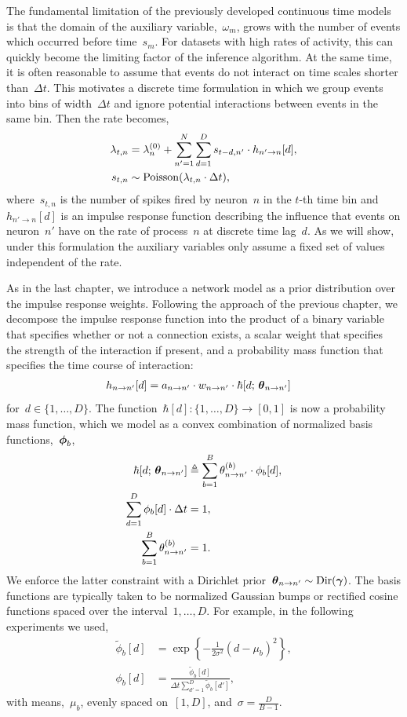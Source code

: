 The fundamental limitation of the previously developed continuous time
models is that the domain of the auxiliary
variable,~$\omega_m$, grows with the number of events which
occurred before time~$s_{m}$. For datasets with high rates of
activity, this can quickly become the limiting factor of the inference
algorithm.  At the same time, it is often reasonable to assume that
events do not interact on time scales shorter than~$\Delta t$. This
motivates a discrete time formulation in which we group events into bins
of width~$\Delta t$ and ignore potential interactions between events
in the same bin. Then the rate becomes,
\begin{align}
\label{eq:disc_hawkes_rate}
\lambda_{t,n} &= \lambda_n^{(0)} +
\sum_{n' = 1}^N \sum_{d=1}^{D} s_{t-d,n'} \cdot h_{n' \to n}[d], \\
\nonumber
s_{t,n} &\sim \mathrm{Poisson}(\lambda_{t,n} \cdot \Delta t),
\end{align}
where~$s_{t,n}$ is the number of spikes fired by neuron~$n$ in the
$t$-th time bin and~${h_{n' \to n}[d]}$ is an impulse response
function describing the influence that events on neuron~$n'$ have on
the rate of process~$n$ at discrete time lag~${d}$. As we will show,
under this formulation the auxiliary variables only assume a fixed set
of values independent of the rate.

As in the last chapter, we introduce a network model as a prior
distribution over the impulse response weights. Following the approach
of the previous chapter, we decompose the impulse response function
into the product of a binary variable that specifies whether or not a
connection exists, a scalar weight that specifies the strength of the
interaction if present, and a probability mass function that specifies
the time course of interaction:
\begin{align*}
  h_{n \to n'}[d]
  &= a_{n \to n'} \cdot w_{n \to n'} \cdot \hbar[d; \, \boldsymbol{\theta}_{n \to n'}] 
\end{align*}
for~${d \in\{1,\ldots,D\}}$.  
The function~${\hbar[d]: \{1, \ldots, D\} \to
  [0,1]}$ is now a probability mass function, which we model as a convex
combination of normalized basis functions,~$\boldsymbol{\phi}_b$,
\begin{align*}
  \hbar[d; \, \boldsymbol{\theta}_{n \to n'}]
  &\triangleq \sum_{b=1}^B \theta_{n \to n'}^{(b)} \cdot \phi_b[d], \\
  \sum_{d=1}^D \phi_b[d] \cdot \Delta t  &= 1, \\
  \sum_{b=1}^B \theta_{n \to n'}^{(b)} &= 1.
\end{align*}
We enforce the latter constraint with a Dirichlet
prior~${\boldsymbol{\theta}_{n \to n'} \sim \mathrm{Dir}(\boldsymbol{\gamma})}$.
The basis functions are typically taken to be normalized Gaussian bumps or
rectified cosine functions spaced over the interval~${1,\ldots,D}$. For example,
in the following experiments we used,
\begin{align*}
  \widetilde{\phi}_b[d] &= \exp \left \{-\frac{1}{2\sigma^2} (d-\mu_b)^2 \right\}, \\
  \phi_b[d] &= \frac{\widetilde{\phi}_b[d] }{\Delta t \sum_{d'=1}^D \widetilde{\phi}_b[d']},
\end{align*}
with means,~$\mu_b$, evenly spaced on~$[1,D]$, and~$\sigma=\tfrac{D}{B-1}$.

